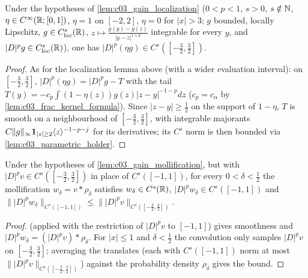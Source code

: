 \begin{lemma}
  \label{lem:c03_gain_localization_wide}
  Under the hypotheses of \cref{lem:c03_gain_localization} ($0<p<1$, $s>0$, $s\notin\mathbb{N}$,
  $\eta\in C^\infty(\mathbb{R};[0,1])$, $\eta=1$ on $[-2,2]$, $\eta=0$ for $|x|>3$; $g$ bounded, locally Lipschitz,
  $g\in C^s_{\textup{loc}}(\mathbb{R})$, $z\mapsto\frac{g(y)-g(z)}{|y-z|^{1+p}}$ integrable for every $y$, and
  $|D|^pg\in C^s_{\textup{loc}}(\mathbb{R})$), one has $|D|^p(\eta g)\in C^s([-\frac32,\frac32])$.
\end{lemma}
\begin{proof}
  As for the localization lemma above (with a wider evaluation interval): on $[-\frac32,\frac32]$, $|D|^p(\eta g)=|D|^pg-T$ with the tail
  $T(y)=-c_p\int(1-\eta(z))g(z)|z-y|^{-1-p}dz$ ($c_p=c_\alpha$ by \cref{lem:c03_frac_kernel_formula}).
  Since $|z-y|\ge\frac12$ on the support of $1-\eta$, $T$ is smooth on a neighbourhood of
  $[-\frac32,\frac32]$, with integrable majorants $C\|g\|_\infty\mathbf 1_{|z|\ge2}\langle z \rangle^{-1-p-j}$ for its
  derivatives; its $C^s$ norm is then bounded via \cref{lem:c03_parametric_holder}.
\end{proof}

\begin{lemma}
  \label{lem:c03_gain_mollification_wide}
  Under the hypotheses of \cref{lem:c03_gain_mollification}, but with $|D|^pv\in C^s([-\frac32,\frac32])$
  in place of $C^s([-1,1])$, for every $0<\delta<\frac12$ the mollification $w_\delta=v*\rho_\delta$ satisfies
  $w_\delta\in C^s(\mathbb{R})$, $|D|^pw_\delta\in C^s([-1,1])$ and
  $\||D|^pw_\delta\|_{C^s([-1,1])}\le\||D|^pv\|_{C^s([-\frac32,\frac32])}$.
\end{lemma}
\begin{proof}
   (applied with the restriction of $|D|^pv$ to $[-1,1]$) gives
  smoothness and $|D|^pw_\delta=(|D|^pv)*\rho_\delta$. For $|x|\le1$ and $\delta<\frac12$ the convolution
  only samples $|D|^pv$ on $[-\frac32,\frac32]$; averaging the translates (each with $C^s([-1,1])$ norm at most
  $\||D|^pv\|_{C^s([-\frac32,\frac32])}$) against the probability density $\rho_\delta$ gives the bound.
\end{proof}

